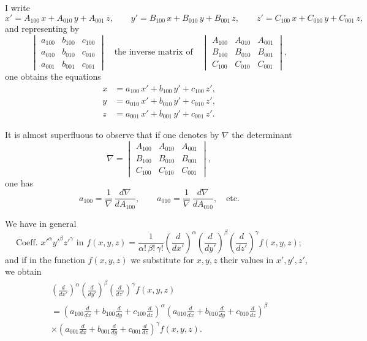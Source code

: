 \documentclass[11pt]{article}
\begin{document}
\medskip
I write
\[
x' = A_{100}\,x + A_{010}\,y + A_{001}\,z,\qquad
y' = B_{100}\,x + B_{010}\,y + B_{001}\,z,\qquad
z' = C_{100}\,x + C_{010}\,y + C_{001}\,z,
\]
and representing by
\[
\begin{vmatrix}
a_{100} & b_{100} & c_{100} \\
a_{010} & b_{010} & c_{010} \\
a_{001} & b_{001} & c_{001}
\end{vmatrix}
\quad\text{the inverse matrix of}\quad
\begin{vmatrix}
A_{100} & A_{010} & A_{001} \\
B_{100} & B_{010} & B_{001} \\
C_{100} & C_{010} & C_{001}
\end{vmatrix},
\]
one obtains the equations
\begin{align*}
x &= a_{100}\,x' + b_{100}\,y' + c_{100}\,z', \\
y &= a_{010}\,x' + b_{010}\,y' + c_{010}\,z', \\
z &= a_{001}\,x' + b_{001}\,y' + c_{001}\,z'.
\end{align*}

It is almost superfluous to observe that if one denotes by $\nabla$ the determinant
\[
\nabla =
\begin{vmatrix}
A_{100} & A_{010} & A_{001} \\
B_{100} & B_{010} & B_{001} \\
C_{100} & C_{010} & C_{001}
\end{vmatrix},
\]
one has
\[
a_{100} = \frac{1}{\nabla}\,\frac{d\nabla}{dA_{100}},\qquad
a_{010} = \frac{1}{\nabla}\,\frac{d\nabla}{dA_{010}},\quad\text{etc.}
\]

We have in general
\[
\text{Coeff. } x'^\alpha y'^\beta z'^\gamma \text{ in } f(x,y,z)
= \frac{1}{\alpha!\,\beta!\,\gamma!}
\left(\frac{d}{dx'}\right)^\alpha
\left(\frac{d}{dy'}\right)^\beta
\left(\frac{d}{dz'}\right)^\gamma
f(x,y,z);
\]
and if in the function $f(x,y,z)$ we substitute for $x,y,z$ their values in $x',y',z'$, we obtain
\begin{multline*}
\left(\frac{d}{dx'}\right)^\alpha
\left(\frac{d}{dy'}\right)^\beta
\left(\frac{d}{dz'}\right)^\gamma f(x,y,z) \\
= \left(a_{100}\frac{d}{dx} + b_{100}\frac{d}{dy} + c_{100}\frac{d}{dz}\right)^\alpha
\left(a_{010}\frac{d}{dx} + b_{010}\frac{d}{dy} + c_{010}\frac{d}{dz}\right)^\beta \\
\times \left(a_{001}\frac{d}{dx} + b_{001}\frac{d}{dy} + c_{001}\frac{d}{dz}\right)^\gamma f(x,y,z).
\end{multline*}
\end{document}
